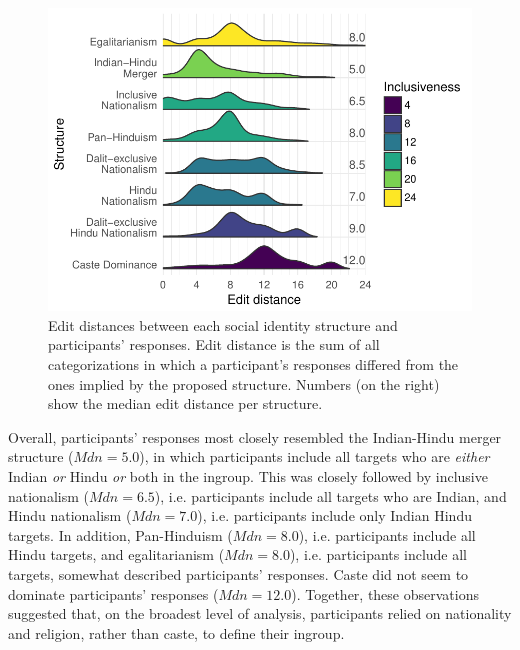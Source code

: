 \documentclass[12pt, a4paper]{article}
\begin{document}
\begin{figure}
\centering
\includegraphics[scale=1]{../figures/appendices/appendices-b-1}
\caption[Edit distances between social identity structures and participants' responses]{Edit distances between each social identity structure and participants' responses. Edit distance is the sum of all categorizations in which a participant's responses differed from the ones implied by the proposed structure. Numbers (on the right) show the median edit distance per structure. %
}
\label{fig:b-1}
\end{figure}

Overall, participants' responses most closely resembled the Indian-Hindu merger structure ($\textit{Mdn} = 5.0$), in which participants include all targets who are \emph{either} Indian \emph{or} Hindu \emph{or} both in the ingroup. This was closely followed by inclusive nationalism ($\textit{Mdn} = 6.5$), i.e. participants include all targets who are Indian, and Hindu nationalism ($\textit{Mdn} = 7.0$), i.e. participants include only Indian Hindu targets. In addition, Pan-Hinduism ($\textit{Mdn} = 8.0$), i.e. participants include all Hindu targets, and egalitarianism ($\textit{Mdn} = 8.0$), i.e. participants include all targets, somewhat described participants' responses. Caste did not seem to dominate participants' responses ($\textit{Mdn} = 12.0$). Together, these observations suggested that, on the broadest level of analysis, participants relied on nationality and religion, rather than caste, to define their ingroup.
\end{document}
